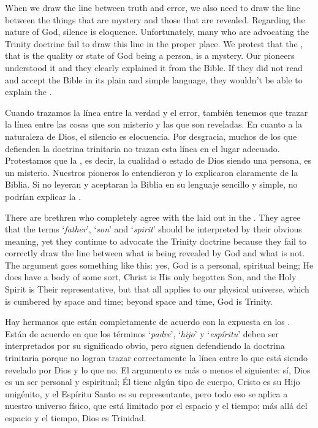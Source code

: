 When we draw the line between truth and error, we also need to draw the line between the things that are mystery and those that are revealed. Regarding the nature of God, silence is eloquence. Unfortunately, many who are advocating the Trinity doctrine fail to draw this line in the proper place. We protest that the , that is the quality or state of God being a person, is a mystery. Our pioneers understood it and they clearly explained it from the Bible. If they did not read and accept the Bible in its plain and simple language, they wouldn’t be able to explain the .


Cuando trazamos la línea entre la verdad y el error, también tenemos que trazar la línea entre las cosas que son misterio y las que son reveladas. En cuanto a la naturaleza de Dios, el silencio es elocuencia. Por desgracia, muchos de los que defienden la doctrina trinitaria no trazan esta línea en el lugar adecuado. Protestamos que la , es decir, la cualidad o estado de Dios siendo una persona, es un misterio. Nuestros pioneros lo entendieron y lo explicaron claramente de la Biblia. Si no leyeran y aceptaran la Biblia en su lenguaje sencillo y simple, no podrían explicar la .


There are brethren who completely agree with the  laid out in the . They agree that the terms ‘\textit{father}’, ‘\textit{son}’ and ‘\textit{spirit}’ should be interpreted by their obvious meaning, yet they continue to advocate the Trinity doctrine because they fail to correctly draw the line between what is being revealed by God and what is not. The argument goes something like this: yes, God is a personal, spiritual being; He does have a body of some sort, Christ is His only begotten Son, and the Holy Spirit is Their representative, but that all applies to our physical universe, which is cumbered by space and time; beyond space and time, God is Trinity.


Hay hermanos que están completamente de acuerdo con la  expuesta en los . Están de acuerdo en que los términos ‘\textit{padre}’, ‘\textit{hijo}’ y ‘\textit{espíritu}’ deben ser interpretados por su significado obvio, pero siguen defendiendo la doctrina trinitaria porque no logran trazar correctamente la línea entre lo que está siendo revelado por Dios y lo que no. El argumento es más o menos el siguiente: sí, Dios es un ser personal y espiritual; Él tiene algún tipo de cuerpo, Cristo es su Hijo unigénito, y el Espíritu Santo es su representante, pero todo eso se aplica a nuestro universo físico, que está limitado por el espacio y el tiempo; más allá del espacio y el tiempo, Dios es Trinidad.


